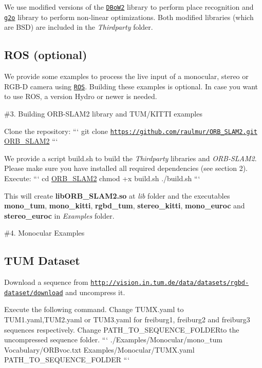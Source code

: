 We use modified versions of the \href{https://github.com/dorian3d/DBoW2}{\tt D\-Bo\-W2} library to perform place recognition and \href{https://github.com/RainerKuemmerle/g2o}{\tt g2o} library to perform non-\/linear optimizations. Both modified libraries (which are B\-S\-D) are included in the {\itshape Thirdparty} folder.

\subsection*{R\-O\-S (optional)}

We provide some examples to process the live input of a monocular, stereo or R\-G\-B-\/\-D camera using \href{ros.org}{\tt R\-O\-S}. Building these examples is optional. In case you want to use R\-O\-S, a version Hydro or newer is needed.

\#3. Building O\-R\-B-\/\-S\-L\-A\-M2 library and T\-U\-M/\-K\-I\-T\-T\-I examples

Clone the repository\-: ``` git clone \href{https://github.com/raulmur/ORB_SLAM2.git}{\tt https\-://github.\-com/raulmur/\-O\-R\-B\-\_\-\-S\-L\-A\-M2.\-git} \hyperlink{namespaceORB__SLAM2}{O\-R\-B\-\_\-\-S\-L\-A\-M2} ```

We provide a script {\ttfamily build.\-sh} to build the {\itshape Thirdparty} libraries and {\itshape O\-R\-B-\/\-S\-L\-A\-M2}. Please make sure you have installed all required dependencies (see section 2). Execute\-: ``` cd \hyperlink{namespaceORB__SLAM2}{O\-R\-B\-\_\-\-S\-L\-A\-M2} chmod +x build.\-sh ./build.sh ```

This will create {\bfseries lib\-O\-R\-B\-\_\-\-S\-L\-A\-M2.\-so} at {\itshape lib} folder and the executables {\bfseries mono\-\_\-tum}, {\bfseries mono\-\_\-kitti}, {\bfseries rgbd\-\_\-tum}, {\bfseries stereo\-\_\-kitti}, {\bfseries mono\-\_\-euroc} and {\bfseries stereo\-\_\-euroc} in {\itshape Examples} folder.

\#4. Monocular Examples

\subsection*{T\-U\-M Dataset}


\begin{DoxyEnumerate}
\item Download a sequence from \href{http://vision.in.tum.de/data/datasets/rgbd-dataset/download}{\tt http\-://vision.\-in.\-tum.\-de/data/datasets/rgbd-\/dataset/download} and uncompress it.
\item Execute the following command. Change {\ttfamily T\-U\-M\-X.\-yaml} to T\-U\-M1.\-yaml,T\-U\-M2.\-yaml or T\-U\-M3.\-yaml for freiburg1, freiburg2 and freiburg3 sequences respectively. Change {\ttfamily P\-A\-T\-H\-\_\-\-T\-O\-\_\-\-S\-E\-Q\-U\-E\-N\-C\-E\-\_\-\-F\-O\-L\-D\-E\-R}to the uncompressed sequence folder. ``` ./\-Examples/\-Monocular/mono\-\_\-tum Vocabulary/\-O\-R\-Bvoc.\-txt Examples/\-Monocular/\-T\-U\-M\-X.\-yaml P\-A\-T\-H\-\_\-\-T\-O\-\_\-\-S\-E\-Q\-U\-E\-N\-C\-E\-\_\-\-F\-O\-L\-D\-E\-R ```
\end{DoxyEnumerate}


